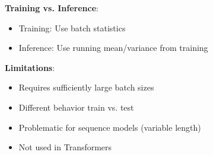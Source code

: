 \textbf{Training vs. Inference}:
\begin{itemize}
    \item Training: Use batch statistics
    \item Inference: Use running mean/variance from training
\end{itemize}

\textbf{Limitations}:
\begin{itemize}
    \item Requires sufficiently large batch sizes
    \item Different behavior train vs. test
    \item Problematic for sequence models (variable length)
    \item Not used in Transformers
\end{itemize}


